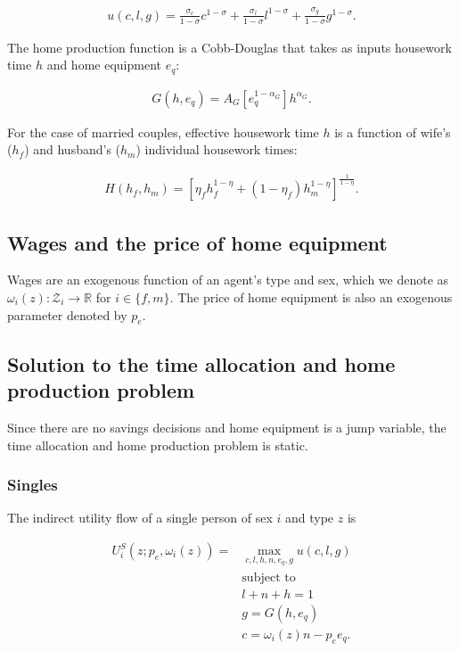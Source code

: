 \documentclass[12pt]{article}
\begin{document}
\begin{align*}
	u\left(c,l,g\right) = \frac{\sigma_c}{1-\sigma}c^{1-\sigma}+\frac{\sigma_l}{1-\sigma}l^{1-\sigma}+\frac{\sigma_g}{1-\sigma}g^{1-\sigma}.
\end{align*}

The home production function is a Cobb-Douglas that takes as inputs housework time $h$ and home equipment $e_q$:

\begin{align*}
	G\left(h,e_q\right) = A_G\left[e_q^{1-\alpha_G}\right]h^{\alpha_G}.
\end{align*}

For the case of married couples, effective housework time $h$ is a function of wife's ($h_f$) and husband's ($h_m$) individual housework times:

\begin{align*}
	H(h_f,h_m)=\left[\eta_f h_f^{1-\eta}+\left(1-\eta_f\right)h_m^{1-\eta}\right]^{\frac{1}{1-\eta}}.
\end{align*}

\subsection{Wages and the price of home equipment}

Wages are an exogenous function of an agent's type and sex, which we denote as $\omega_i\left(z\right):\mathcal{Z}_i\to \mathbb{R}$ for $i\in\{f,m\}$. The price of home equipment is also an exogenous parameter denoted by $p_e$.

\subsection{Solution to the time allocation and home production problem}

Since there are no savings decisions and home equipment is a jump variable, the time allocation and home production problem is static. 

\subsubsection{Singles}

The indirect utility flow of a single person of sex $i$ and type $z$ is

\begin{align}
	U_i^S\left(z;p_e,\omega_i(z)\right) = & \max_{c,l,h,n,e_q,g} u\left(c,l,g\right) \label{eq:singletaprob} \\
	& \text{subject to} \nonumber \\
	& l+n+h = 1 \nonumber \\
	& g = G\left(h,e_q\right) \nonumber \\
	& c = \omega_i\left(z\right)n-p_e e_q. \nonumber
\end{align}
\end{document}
